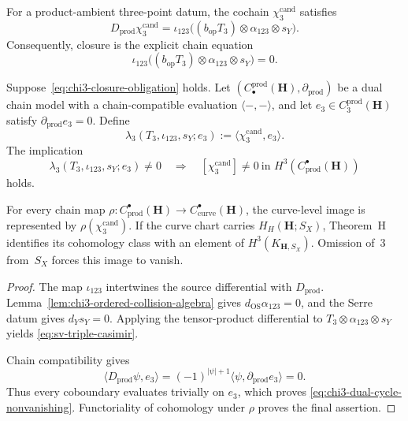 \begin{theorem}
\label{thm:chirhoch3-Delta5-chain-level}
\ClaimStatusConditional
For a product-ambient three-point datum, the cochain
\(\chi_3^{\mathrm{cand}}\) satisfies
\begin{equation}
\label{eq:sv-triple-casimir}
 D_{\mathrm{prod}}\chi_3^{\mathrm{cand}}
 =\iota_{123}
 \bigl((b_{\mathrm{op}}T_3)\otimes\alpha_{123}\otimes s_Y\bigr).
\end{equation}
Consequently, closure is the explicit chain equation
\begin{equation}
\label{eq:chi3-closure-obligation}
 \iota_{123}
 \bigl((b_{\mathrm{op}}T_3)\otimes\alpha_{123}\otimes s_Y\bigr)=0.
\end{equation}

Suppose~\eqref{eq:chi3-closure-obligation} holds.  Let
\((C^{\mathrm{prod}}_\bullet(\mathbf H),\partial_{\mathrm{prod}})\)
be a dual chain model with a chain-compatible evaluation
\(\langle-,-\rangle\), and let
\(e_3\in C^{\mathrm{prod}}_3(\mathbf H)\) satisfy
\(\partial_{\mathrm{prod}}e_3=0\).  Define
\begin{equation}
\label{eq:chi3-rational-value}
\label{eq:chi3-triangle-value-corrected}
 \lambda_3(T_3,\iota_{123},s_Y;e_3)
 :=\bigl\langle\chi_3^{\mathrm{cand}},e_3\bigr\rangle.
\end{equation}
The implication
\begin{equation}
\label{eq:chi3-dual-cycle-nonvanishing}
 \lambda_3(T_3,\iota_{123},s_Y;e_3)\ne0
 \quad\Longrightarrow\quad
 [\chi_3^{\mathrm{cand}}]\ne0
 \ \text{in }H^3(C^\bullet_{\mathrm{prod}}(\mathbf H))
\end{equation}
holds.

For every chain map
\(\rho:C^\bullet_{\mathrm{prod}}(\mathbf H)\to
C^\bullet_{\mathrm{curve}}(\mathbf H)\), the curve-level image is
represented by \(\rho(\chi_3^{\mathrm{cand}})\).  If the curve chart
carries $H_H(\mathbf H;S_X)$, Theorem~H identifies its cohomology
class with an element of $H^3(K_{\mathbf H,S_X})$.  Omission of~$3$
from~$S_X$ forces this image to vanish.
\end{theorem}

\begin{proof}
The map \(\iota_{123}\) intertwines the source differential with
\(D_{\mathrm{prod}}\).  Lemma~\ref{lem:chi3-ordered-collision-algebra}
gives \(d_{\mathrm{OS}}\alpha_{123}=0\), and the Serre datum gives
\(d_Ys_Y=0\).  Applying the tensor-product differential to
\(T_3\otimes\alpha_{123}\otimes s_Y\) yields
\eqref{eq:sv-triple-casimir}.

Chain compatibility gives
\[
 \langle D_{\mathrm{prod}}\psi,e_3\rangle
 =(-1)^{|\psi|+1}
 \langle\psi,\partial_{\mathrm{prod}}e_3\rangle=0.
\]
Thus every coboundary evaluates trivially on \(e_3\), which proves
\eqref{eq:chi3-dual-cycle-nonvanishing}.  Functoriality of cohomology
under \(\rho\) proves the final assertion.
\end{proof}


